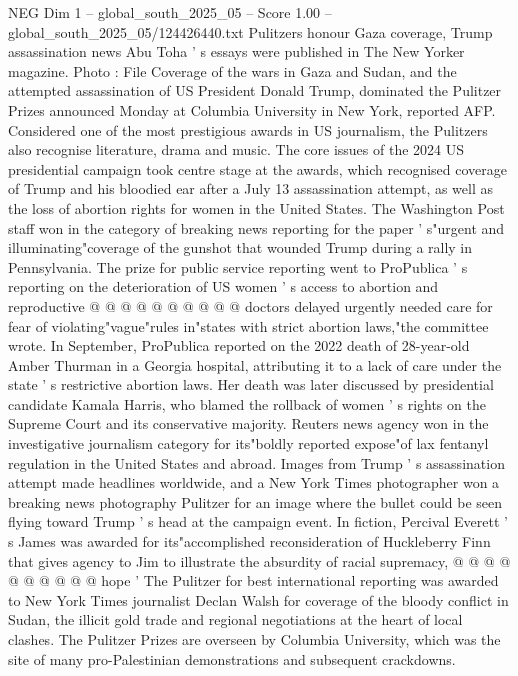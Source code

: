 \begin{textsample}{NEG Dim 1 – global\_south\_2025\_05 – Score 1.00 – global\_south\_2025\_05/124426440.txt}  \label{ex:f1_neg_388}
Pulitzers honour Gaza coverage, Trump assassination news Abu Toha ' s essays were published in The New Yorker magazine.
Photo : File Coverage of the wars in Gaza and Sudan, and the attempted assassination of US President Donald Trump, dominated the Pulitzer Prizes announced Monday at Columbia University in New York, reported AFP.
Considered one of the most prestigious awards in US journalism, the Pulitzers also recognise literature, drama and music.
The core issues of the 2024 US presidential campaign took centre stage at the awards, which recognised coverage of Trump and his bloodied ear after a July 13 assassination attempt, as well as the loss of abortion rights for women in the United States.
The Washington Post staff won in the category of breaking news reporting for the paper ' s"urgent and illuminating"coverage of the gunshot that wounded Trump during a rally in Pennsylvania.
The prize for public service reporting went to ProPublica ' s reporting on the deterioration of US women ' s access to abortion and reproductive @ @ @ @ @ @ @ @ @ @ doctors delayed urgently needed care for fear of violating"vague"rules in"states with strict abortion laws,"the committee wrote.
In September, ProPublica reported on the 2022 death of 28-year-old Amber Thurman in a Georgia hospital, attributing it to a lack of care under the state ' s restrictive abortion laws.
Her death was later discussed by presidential candidate Kamala Harris, who blamed the rollback of women ' s rights on the Supreme Court and its conservative majority.
Reuters news agency won in the investigative journalism category for its"boldly reported expose"of lax fentanyl regulation in the United States and abroad.
Images from Trump ' s assassination attempt made headlines worldwide, and a New York Times photographer won a breaking news photography Pulitzer for an image where the bullet could be seen flying toward Trump ' s head at the campaign event.
In fiction, Percival Everett ' s James was awarded for its"accomplished reconsideration of Huckleberry Finn that gives agency to Jim to illustrate the absurdity of racial supremacy, @ @ @ @ @ @ @ @ @ @ hope ' The Pulitzer for best international reporting was awarded to New York Times journalist Declan Walsh for coverage of the bloody conflict in Sudan, the illicit gold trade and regional negotiations at the heart of local clashes.
The Pulitzer Prizes are overseen by Columbia University, which was the site of many pro-Palestinian demonstrations and subsequent crackdowns.

\end{textsample}
